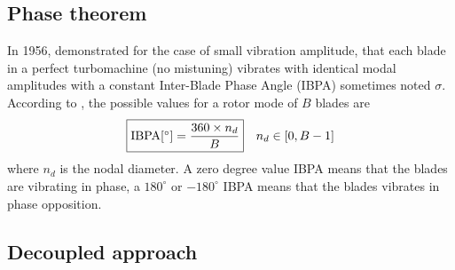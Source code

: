 \subsection{Phase theorem}
\label{sub:lane_theorem}

In 1956, \citet{Lane1956} 
demonstrated for the case of small vibration amplitude,
that each blade in a perfect turbomachine (no mistuning) vibrates with
identical modal amplitudes with a constant Inter-Blade
Phase Angle (IBPA) sometimes noted $\sigma$. 
According to \citet{Lane1956}, the possible values 
for a rotor mode of $B$ blades are
\begin{equation}
    \fbox{$\textrm{IBPA} [^\circ] = \displaystyle \frac{360 \times n_d}{B}$} \quad n_d \in [0, B-1]
\end{equation}
where $n_d$ is the nodal diameter.
A zero degree value IBPA means that the blades are vibrating in phase, a $180^\circ$ or
$-180^\circ$ IBPA means that the blades vibrates in phase opposition.

\subsection{Decoupled approach}
\label{sub:weak_coupling_approach}

